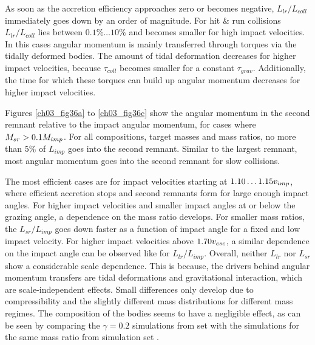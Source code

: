 As soon as the accretion efficiency approaches zero or becomes negative, $L_{lr} / L_{coll}$ immediately goes down by an order of magnitude. For hit \& run collisions $L_{lr} / L_{coll}$ lies between $0.1\% \dots 10\%$ and becomes smaller for high impact velocities. In this cases angular momentum is mainly transferred through torques via the tidally deformed bodies. The amount of tidal deformation decreases for higher impact velocities, because $\tau_{coll}$ becomes smaller for a constant $\tau_{grav}$. Additionally, the time for which these torques can build up angular momentum decreases for higher impact velocities.

Figures \ref{ch03_fig36a} to \ref{ch03_fig36c} show the angular momentum in the second remnant relative to the impact angular momentum, for cases where $M_{sr} > 0.1 M_{imp}$. For all compositions, target masses and mass ratios, no more than $5\%$ of $L_{imp}$ goes into the second remnant. Similar to the largest remnant, most angular momentum goes into the second remnant for slow collisions. 

The most efficient cases are for impact velocities starting at $1.10 \dots 1.15 v_{imp}$, where efficient accretion stops and second remnants form for large enough impact angles. For higher impact velocities and smaller impact angles at or below the grazing angle, a dependence on the mass ratio develops. For smaller mass ratios, the $L_{sr} / L_{imp}$ goes down faster as a function of impact angle for a fixed and low impact velocity. For higher impact velocities above $1.70 v_{esc}$, a similar dependence on the impact angle can be observed like for $L_{lr} / L_{imp}$.  Overall, neither $L_{lr}$ nor $L_{sr}$ show a considerable scale dependence. This is because, the drivers behind angular momentum transfers are tidal deformations and gravitational interaction, which are scale-independent effects. Small differences only develop due to compressibility and the slightly different mass distributions for different mass regimes. The composition of the bodies seems to have a negligible effect, as can be seen by comparing the $\gamma = 0.2$ simulations from set \css with the simulations for the same mass ratio from simulation set \iss.

